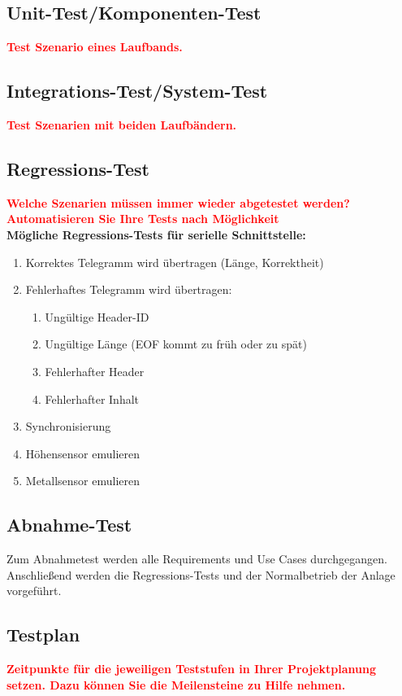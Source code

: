 \documentclass[oneside,a4paper,titlepage]{scrartcl} %
\begin{document}
\subsection{Unit-Test/Komponenten-Test}
\textcolor{red}{\textbf{Test Szenario eines Laufbands.}}

\subsection{Integrations-Test/System-Test}
\textcolor{red}{\textbf{Test Szenarien mit beiden Laufbändern.}}

\subsection{Regressions-Test}
\textcolor{red}{\textbf{Welche Szenarien müssen immer wieder abgetestet werden? Automatisieren Sie Ihre Tests nach
Möglichkeit}}\\
\newline
\textbf{Mögliche Regressions-Tests für serielle Schnittstelle:}\\
\begin{enumerate}
 \item Korrektes Telegramm wird übertragen (Länge, Korrektheit)
 \item Fehlerhaftes Telegramm wird übertragen:
 \begin{enumerate}
  \item Ungültige Header-ID
  \item Ungültige Länge (EOF kommt zu früh oder zu spät)
  \item Fehlerhafter Header
  \item Fehlerhafter Inhalt
 \end{enumerate}
 \item Synchronisierung
 \item Höhensensor emulieren
 \item Metallsensor emulieren
\end{enumerate}

\subsection{Abnahme-Test}
Zum Abnahmetest werden alle Requirements und Use Cases durchgegangen. Anschließend werden
die Regressions-Tests und der Normalbetrieb der Anlage vorgeführt.

\subsection{Testplan}
\textcolor{red}{\textbf{Zeitpunkte für die jeweiligen Teststufen in Ihrer Projektplanung setzen.
Dazu können Sie die Meilensteine zu Hilfe nehmen.}}
\end{document}
